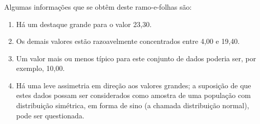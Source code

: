 \documentclass[14pt,aspectratio=1610]{beamer}
\begin{document}
\begin{frame}{}
\frametitle{}
\small
\begin{block}{}
\justifying
\begin{table}[H]
\caption{Diagrama de Ramos e Folhas dos Salários ($\times$ sal. Min)}
\end{table}
\end{block}
\end{frame}

\begin{frame}{}
\frametitle{}
\begin{block}{}
\justifying
Algumas informações que se obtêm deste ramo-e-folhas são:
\begin{enumerate}
\item \justifying Há um destaque grande para o valor 23,30.\pause
\item \justifying Os demais valores estão razoavelmente concentrados entre 4,00 e 19,40.\pause
\item \justifying Um valor mais ou menos típico para este conjunto de dados poderia ser, por 
exemplo, 10,00.\pause
\item \justifying Há uma leve assimetria em direção aos valores grandes; a suposição de que estes dados possam ser considerados como amostra de uma população com distribuição simétrica, em forma de sino (a chamada distribuição normal), pode ser questionada.
\end{enumerate}
\nocite{Morettin09, Apostila, eric, montgomery2016, Bastos2025}
\end{block}
\end{frame}

\begin{frame}[allowframebreaks]
\frametitle{}
\printbibliography
\end{frame}
\end{document}
